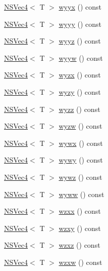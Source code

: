 \begin{DoxyCompactItemize}
\item 
\hyperlink{structNSVec4}{N\-S\-Vec4}$<$ T $>$ \hyperlink{structNSVec4_a3de2060d1fc3aed38a8108b3a564abbf}{wyyx} () const 
\item 
\hyperlink{structNSVec4}{N\-S\-Vec4}$<$ T $>$ \hyperlink{structNSVec4_a2ceadbc24a6ee085badda92208009e62}{wyyy} () const 
\item 
\hyperlink{structNSVec4}{N\-S\-Vec4}$<$ T $>$ \hyperlink{structNSVec4_a6060d4a3af6ab1c28c0561be206e7d0e}{wyyz} () const 
\item 
\hyperlink{structNSVec4}{N\-S\-Vec4}$<$ T $>$ \hyperlink{structNSVec4_a2eb94e17a3b18d62d7265b5cec18e265}{wyyw} () const 
\item 
\hyperlink{structNSVec4}{N\-S\-Vec4}$<$ T $>$ \hyperlink{structNSVec4_acce362c8062f1abbd88f56400ff0f691}{wyzx} () const 
\item 
\hyperlink{structNSVec4}{N\-S\-Vec4}$<$ T $>$ \hyperlink{structNSVec4_a3dd6153613ba31422aecd0fc3699bbae}{wyzy} () const 
\item 
\hyperlink{structNSVec4}{N\-S\-Vec4}$<$ T $>$ \hyperlink{structNSVec4_a017361fbf8b3755354375e4eff6e4cf8}{wyzz} () const 
\item 
\hyperlink{structNSVec4}{N\-S\-Vec4}$<$ T $>$ \hyperlink{structNSVec4_a146c02c941ed594a4f3cb5906d9d71c2}{wyzw} () const 
\item 
\hyperlink{structNSVec4}{N\-S\-Vec4}$<$ T $>$ \hyperlink{structNSVec4_a60acb6d9ed3a97bef62a3723a918bc5e}{wywx} () const 
\item 
\hyperlink{structNSVec4}{N\-S\-Vec4}$<$ T $>$ \hyperlink{structNSVec4_ab4a242b6207014b68a2ee5b4e54dd7bc}{wywy} () const 
\item 
\hyperlink{structNSVec4}{N\-S\-Vec4}$<$ T $>$ \hyperlink{structNSVec4_a4705e271cd28da3678a24552750f3f3a}{wywz} () const 
\item 
\hyperlink{structNSVec4}{N\-S\-Vec4}$<$ T $>$ \hyperlink{structNSVec4_a7257eb45996b6c90cc29b606ef5b88d4}{wyww} () const 
\item 
\hyperlink{structNSVec4}{N\-S\-Vec4}$<$ T $>$ \hyperlink{structNSVec4_a416b7fcebfda310abd8491f5a1571b98}{wzxx} () const 
\item 
\hyperlink{structNSVec4}{N\-S\-Vec4}$<$ T $>$ \hyperlink{structNSVec4_ab836a8c6e131db8ca93aba91d56991b1}{wzxy} () const 
\item 
\hyperlink{structNSVec4}{N\-S\-Vec4}$<$ T $>$ \hyperlink{structNSVec4_a8842aa01a3319704448e892a1a62c7c0}{wzxz} () const 
\item 
\hyperlink{structNSVec4}{N\-S\-Vec4}$<$ T $>$ \hyperlink{structNSVec4_a0581167b165659a450be7c2fb1ca61d7}{wzxw} () const 

\end{DoxyCompactItemize}
